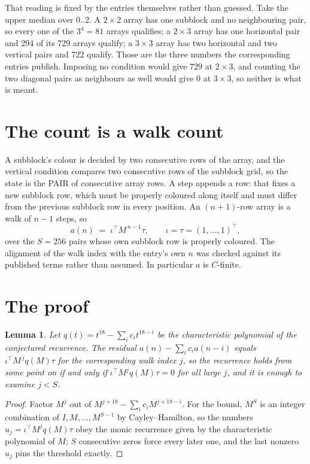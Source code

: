 \documentclass[11pt,a4paper]{article}
\theoremstyle{plain}
\newtheorem{lemma}[theorem]{Lemma}
\theoremstyle{definition}
\begin{document}
That reading is fixed by the entries themselves rather than guessed. Take the upper median
over $0..2$. A $2\times2$ array has one subblock and no neighbouring pair, so every one of the
$3^4=81$ arrays qualifies; a $2\times3$ array has one horizontal pair and $294$ of its $729$
arrays qualify; a $3\times3$ array has two horizontal and two vertical pairs and $722$
qualify. Those are the three numbers the corresponding entries publish. Imposing no condition
would give $729$ at $2\times3$, and counting the two diagonal pairs as neighbours as well
would give $0$ at $3\times3$, so neither is what is meant.

\section{The count is a walk count}

A subblock's colour is decided by two consecutive rows of the array, and
the vertical condition compares two consecutive rows of the subblock grid, so the state is the
PAIR of consecutive array rows. A step appends a row: that fixes a new subblock row, which
must be properly coloured along itself and must differ from the previous subblock row in every
position. An $(n+1)$-row array is a walk of $n-1$ steps, so
\[
a(n)\;=\;\iota^{\!\top}M^{\,n-1}\tau,\qquad\iota=\tau=(1,\dots,1)^{\!\top},
\]
over the $S=256$ pairs whose own subblock row is properly coloured.
The alignment of the walk index with the entry's own $n$ was checked against its published
terms rather than assumed. In particular $a$ is $C$-finite.

\section{The proof}

\begin{lemma}\label{lem:crit}
Let $q(t)=t^{18}-\sum_i c_it^{18-i}$ be the characteristic polynomial of the
conjectured recurrence. The residual $a(n)-\sum_ic_ia(n-i)$ equals
$\iota^{\!\top}M^{\,j}q(M)\tau$ for the corresponding walk index $j$, so the recurrence
holds from some point on if and only if $\iota^{\!\top}M^{j}q(M)\tau=0$ for all large $j$,
and it is enough to examine $j<S$.
\end{lemma}

\begin{proof}
Factor $M^{j}$ out of $M^{j+18}-\sum_ic_iM^{j+18-i}$. For the bound, $M^{S}$
is an integer combination of $I,M,\dots,M^{S-1}$ by Cayley--Hamilton, so the numbers
$u_j=\iota^{\!\top}M^{j}q(M)\tau$ obey the monic recurrence given by the characteristic
polynomial of $M$; $S$ consecutive zeros force every later one, and the last nonzero $u_j$
pins the threshold exactly.
\end{proof}
\end{document}
